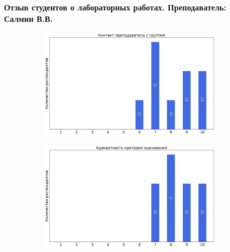         
        \subsubsection{Отзыв студентов о лабораторных работах. Преподаватель: Салмин В.В.}
            \begin{figure}[H]
                \centering
                \begin{subfigure}[b]{0.45\textwidth}
                    \centering
                    \includegraphics[width=\textwidth]{images/3 course/Общая физика - квантовая физика/labniks-marks-Салмин В.В.-0.png}
                \end{subfigure}
                \begin{subfigure}[b]{0.45\textwidth}
                    \centering
                    \includegraphics[width=\textwidth]{images/3 course/Общая физика - квантовая физика/labniks-marks-Салмин В.В.-1.png}
                \end{subfigure}
                \begin{subfigure}[b]{0.45\textwidth}

\end{subfigure}
\end{figure}
